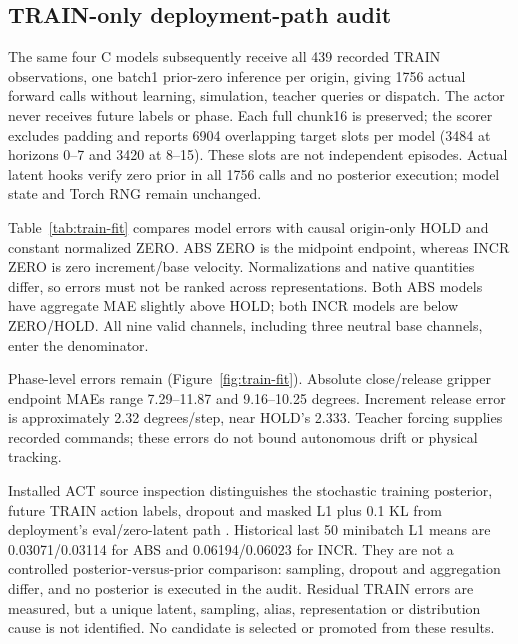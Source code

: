 \documentclass[conference]{IEEEtran}
\begin{document}
\subsection{TRAIN-only deployment-path audit}
The same four C models subsequently receive all 439 recorded TRAIN observations, one batch1 prior-zero inference per origin, giving 1756 actual forward calls without learning, simulation, teacher queries or dispatch. The actor never receives future labels or phase. Each full chunk16 is preserved; the scorer excludes padding and reports 6904 overlapping target slots per model (3484 at horizons 0--7 and 3420 at 8--15). These slots are not independent episodes. Actual latent hooks verify zero prior in all 1756 calls and no posterior execution; model state and Torch RNG remain unchanged.

Table~\ref{tab:train-fit} compares model errors with causal origin-only HOLD and constant normalized ZERO. ABS ZERO is the midpoint endpoint, whereas INCR ZERO is zero increment/base velocity. Normalizations and native quantities differ, so errors must not be ranked across representations. Both ABS models have aggregate MAE slightly above HOLD; both INCR models are below ZERO/HOLD. All nine valid channels, including three neutral base channels, enter the denominator.

\begin{table}[t]
\caption{TRAIN-only normalized MAE over valid slots and all 9 channels. Comparisons apply within representation only; these are not closed-loop task outcomes.}
\centering

\label{tab:train-fit}
\end{table}

Phase-level errors remain (Figure~\ref{fig:train-fit}). Absolute close/release gripper endpoint MAEs range 7.29--11.87 and 9.16--10.25 degrees. Increment release error is approximately 2.32 degrees/step, near HOLD's 2.333. Teacher forcing supplies recorded commands; these errors do not bound autonomous drift or physical tracking.

Installed ACT source inspection distinguishes the stochastic training posterior, future TRAIN action labels, dropout and masked L1 plus 0.1 KL from deployment's eval/zero-latent path \citep{act}. Historical last 50 minibatch L1 means are 0.03071/0.03114 for ABS and 0.06194/0.06023 for INCR. They are not a controlled posterior-versus-prior comparison: sampling, dropout and aggregation differ, and no posterior is executed in the audit. Residual TRAIN errors are measured, but a unique latent, sampling, alias, representation or distribution cause is not identified. No candidate is selected or promoted from these results.
\end{document}
